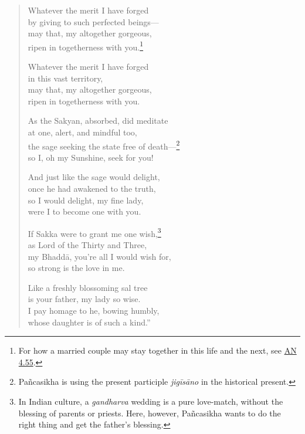 \documentclass[12pt,openany]{book}%
\begin{document}
\begin{verse}
Whatever the merit I have forged \\
by giving to such perfected beings—\\
may that, my altogether gorgeous, \\
ripen in togetherness with you.\footnote{For how a married couple may stay together in this life and the next, see \href{https://suttacentral.net/an4.55/en/sujato}{AN 4.55}. } 

Whatever the merit I have forged \\
in this vast territory, \\
may that, my altogether gorgeous, \\
ripen in togetherness with you. 

As the Sakyan, absorbed, did meditate \\
at one, alert, and mindful too, \\
the sage seeking the state free of death—\footnote{\textsanskrit{Pañcasikha} is using the present participle \textit{\textsanskrit{jigīsāno}} in the historical present. } \\
so I, oh my Sunshine, seek for you! 

And just like the sage would delight, \\
once he had awakened to the truth, \\
so I would delight, my fine lady, \\
were I to become one with you. 

If Sakka were to grant me one wish,\footnote{In Indian culture, a \textit{gandharva} wedding is a pure love-match, without the blessing of parents or priests. Here, however, \textsanskrit{Pañcasikha} wants to do the right thing and get the father’s blessing. } \\
as Lord of the Thirty and Three, \\
my \textsanskrit{Bhaddā}, you’re all I would wish for, \\
so strong is the love in me. 

Like a freshly blossoming sal tree \\
is your father, my lady so wise. \\
I pay homage to he, bowing humbly, \\
whose daughter is of such a kind.” 

%
\end{verse}
\end{document}
